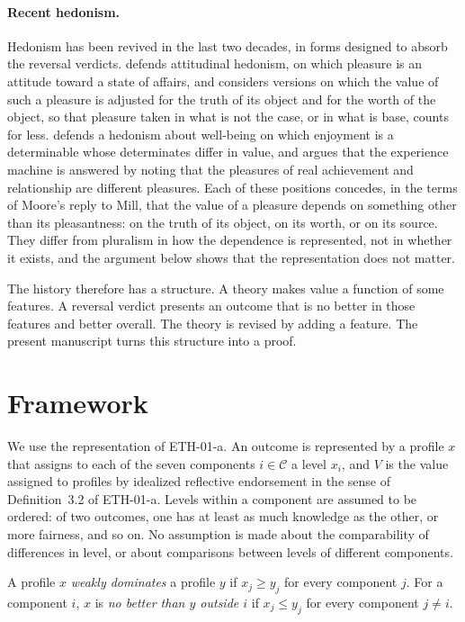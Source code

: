 \documentclass{situationist-preprint}
\begin{document}
\paragraph{Recent hedonism.} Hedonism has been revived in the last two decades, in forms designed to absorb the reversal verdicts. \citet{Feldman2004} defends attitudinal hedonism, on which pleasure is an attitude toward a state of affairs, and considers versions on which the value of such a pleasure is adjusted for the truth of its object and for the worth of the object, so that pleasure taken in what is not the case, or in what is base, counts for less. \citet{Crisp2006} defends a hedonism about well-being on which enjoyment is a determinable whose determinates differ in value, and \citet{Bramble2016} argues that the experience machine is answered by noting that the pleasures of real achievement and relationship are different pleasures. Each of these positions concedes, in the terms of Moore's reply to Mill, that the value of a pleasure depends on something other than its pleasantness: on the truth of its object, on its worth, or on its source. They differ from pluralism in how the dependence is represented, not in whether it exists, and the argument below shows that the representation does not matter.

The history therefore has a structure. A theory makes value a function of some features. A reversal verdict presents an outcome that is no better in those features and better overall. The theory is revised by adding a feature. The present manuscript turns this structure into a proof.

\section{Framework}\label{s:frame}

We use the representation of ETH-01-a. An outcome is represented by a profile $x$ that assigns to each of the seven components $i \in \mathcal{C}$ a level $x_i$, and $V$ is the value assigned to profiles by idealized reflective endorsement in the sense of Definition~3.2 of ETH-01-a. Levels within a component are assumed to be ordered: of two outcomes, one has at least as much knowledge as the other, or more fairness, and so on. No assumption is made about the comparability of differences in level, or about comparisons between levels of different components.

\begin{definition}\label{d:dom}
A profile $x$ \emph{weakly dominates} a profile $y$ if $x_j \geq y_j$ for every component $j$. For a component $i$, $x$ is \emph{no better than $y$ outside $i$} if $x_j \leq y_j$ for every component $j \neq i$.
\end{definition}
\end{document}
